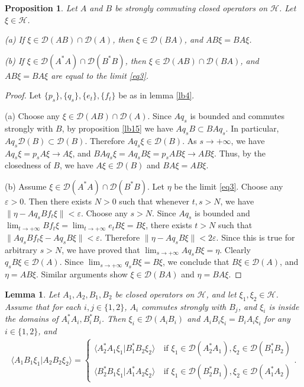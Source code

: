 \documentclass[12pt,a4paper]{article}
\theoremstyle{definition}
\theoremstyle{plain}
\newtheorem{pp}[df]{Proposition}
\newtheorem{lm}[df]{Lemma}
\newcommand{\mc}{\mathcal}
\newcommand{\Dom}{\scr D}
\newcommand{\bk}[1]{\langle {#1}\rangle}
\newcommand{\scr}{\mathscr}
\numberwithin{equation}{subsection}
\begin{document}
\begin{subappendices}
\begin{pp}\label{lb3}
	Let $A$ and $B$ be strongly commuting closed operators on $\mc H$. Let $\xi\in\mc H$.
	
	(a) If $\xi\in\Dom(AB)\cap\Dom(A)$, then $\xi\in\Dom(BA)$, and $AB\xi=BA\xi$.
	
	(b) If $\xi\in\Dom(A^*A)\cap\Dom(B^*B)$, then $\xi\in\Dom(AB)\cap\Dom(BA)$, and $AB\xi=BA\xi$ are equal to the limit \eqref{eq3}.
\end{pp}


\begin{proof}
	Let $\{p_s\},\{q_s\},\{e_t\},\{f_t\}$ be as in lemma \ref{lb4}. 
	
	(a) Choose any $\xi\in\Dom(AB)\cap\Dom(A)$. Since $Aq_s$ is bounded and commutes strongly with $B$, by proposition \ref{lb15} we have $Aq_sB\subset BAq_s$. In particular, $Aq_s\Dom(B)\subset\Dom(B)$. Therefore $Aq_s\xi\in\Dom(B)$. As $s\rightarrow+\infty$, we have $Aq_s\xi=p_sA\xi\rightarrow A\xi$, and $BAq_s\xi=Aq_sB\xi=p_sAB\xi\rightarrow AB\xi$. Thus, by the closedness of $B$, we have $A\xi\in\Dom(B)$ and $BA\xi=AB\xi$.
	
	(b) Assume $\xi\in\Dom(A^*A)\cap\Dom(B^*B)$. Let $\eta$ be the limit \eqref{eq3}. Choose any $\varepsilon>0$. Then there exists $N>0$ such that whenever $t,s>N$, we have  $\lVert \eta-Aq_sBf_t\xi\lVert<\varepsilon$. Choose any $s>N$. Since $Aq_s$ is bounded and $\lim_{t\rightarrow+\infty}Bf_t\xi=\lim_{t\rightarrow+\infty}e_tB\xi=B\xi$, there exists $t>N$ such that $\lVert Aq_sBf_t\xi-Aq_sB\xi\lVert<\varepsilon$. Therefore $\lVert \eta-Aq_sB\xi\lVert<2\varepsilon$. Since this is true for arbitrary $s>N$, we have proved that $\lim_{s\rightarrow+\infty}Aq_sB\xi=\eta$. Clearly $q_sB\xi\in\Dom(A)$. Since $\lim_{s\rightarrow+\infty}q_sB\xi=B\xi$, we conclude that $B\xi\in\Dom(A)$,  and $\eta=AB\xi$. Similar arguments show $\xi\in\Dom(BA)$ and $\eta=BA\xi$.
\end{proof}

\begin{lm}\label{lb14}
	Let $A_1,A_2,B_1,B_2$ be closed operators on $\mc H$, and let $\xi_1,\xi_2\in\mc H$. Assume that for each $i,j\in\{1,2\}$, $A_i$ commutes strongly with $B_j$, and  $\xi_i$ is inside the domains of $A_i^*A_i,B_i^*B_i$. Then  $\xi_i\in\Dom(A_iB_i)$ and  $A_iB_i\xi_i=B_iA_i\xi_i$ for any $i\in\{1,2\}$, and
	\begin{align}
	\bk{A_1B_1\xi_1|A_2B_2\xi_2}=\left\{ \begin{array}{ll}
	\bk{A_2^*A_1\xi_1|B_1^*B_2\xi_2}\ & \text{if }\xi_1\in\Dom(A_2^*A_1),\xi_2\in\Dom(B_1^*B_2)\\
	~&~\\
	\bk{B_2^*B_1\xi_1|A_1^*A_2\xi_2} & \text{if }\xi_1\in\Dom(B_2^*B_1),\xi_2\in\Dom(A_1^*A_2)
	\end{array}\right..\label{eq1}
	\end{align}
\end{lm}




\end{subappendices}
\end{document}
